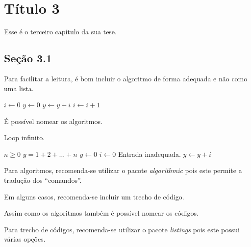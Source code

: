 \chapter{Título 3}
Esse é o terceiro capítulo da sua tese.

\section{Seção 3.1}
Para facilitar a leitura, é bom incluir o algoritmo de forma adequada e não
como uma lista.
\begin{algorithmic}[2]
    \STATE $i \leftarrow 0$
    \STATE $y \leftarrow 0$
        \STATE $y \leftarrow y + i$
        \STATE $i \leftarrow i + 1$
    \ENDFOR
\end{algorithmic}

\'E poss\'ivel nomear os algoritmos.
\begin{algorithm}
    \caption{Loop infinito.}
    \label{alg:loop_inf}
    \begin{algorithmic}
        \REQUIRE $n \geq 0$
        \ENSURE $y = 1 + 2 + \ldots + n$
        \STATE $y \leftarrow 0$
        \STATE $i \leftarrow 0$
            \PRINT Entrada inadequada.
        \ELSE
                \STATE $y \leftarrow y + i$
            \ENDWHILE
        \ENDIF
    \end{algorithmic}
\end{algorithm}

Para algoritmos, recomenda-se utilizar o pacote
\emph{algorithmic} pois este
permite a tradu\c{c}\~ao dos ``comandos''.

Em alguns casos, recomenda-se incluir um trecho de
código.


Assim como os algoritmos tamb\'em \'e poss\'ivel nomear os c\'odigos.


Para trecho de códigos,  recomenda-se utilizar o pacote
\emph{listings} pois
este possui várias opções.
